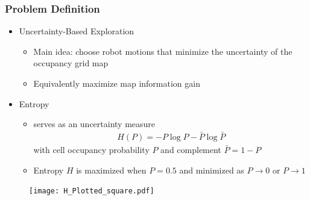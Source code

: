\documentclass[11pt,professionalfonts,hyperref={pdftex,pdfpagemode=none,pdfstartview=FitH}]{beamer}
\renewcommand{\emph}[1]{\textit{\textbf{\color{blue}{#1}}}}
\begin{document}
\begin{frame}
\frametitle{Problem Definition}
\begin{itemize}
        	\item Uncertainty-Based Exploration
	\begin{itemize}
		\item Main idea: choose robot motions that minimize the uncertainty of the occupancy grid map
		\item Equivalently maximize map information gain
	\end{itemize}
\end{itemize}
\begin{minipage}[t]{7.0cm}
\begin{itemize}
	\item Entropy
	\begin{itemize}		
		\item \emph{Shannon's entropy} serves as an uncertainty measure
		\begin{align*}
			H(P)=-P\log P-\bar{P}\log \bar{P}%
		\end{align*}
		with cell occupancy probability $P$ and complement $\bar{P}=1-P$
		\item Entropy $H$ is maximized when $P=0.5$ and minimized as $P\rightarrow0$ or $P\rightarrow1$
	\end{itemize}
\end{itemize}
\end{minipage}
\begin{minipage}[t]{3.0cm}
\vspace*{0.5cm}
\begin{figure}[!htbp]
	\centerline{
		\hspace*{1.25cm}
   		\texttt{[image: H\_Plotted\_square.pdf]}%
	}
\end{figure}
\end{minipage}

\end{frame}
\end{document}
